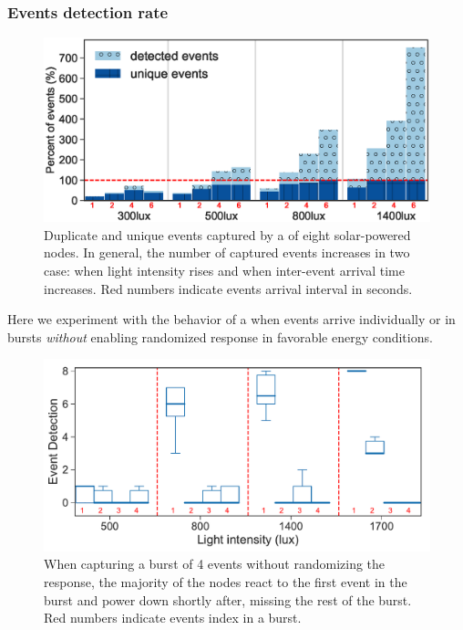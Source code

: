 \subsubsection{Events detection rate}
%
\begin{figure}[t!]
		\centering
	    \includegraphics[width=\columnwidth]{figures/regular_events_capture_rate.eps}
		\caption{Duplicate and unique events captured by a \fullcim of eight solar-powered nodes. In general, the number of captured events increases in two case: when light intensity rises and when inter-event arrival time increases. 
         Red numbers indicate events arrival interval in seconds.
         }
    	\label{fig:events_detection_rate}
\end{figure} 
Here we experiment with the behavior of a \cis when events arrive individually or in bursts \emph{without} enabling  randomized response in favorable energy conditions. 
%
\begin{figure}[t]
    \includegraphics[width=\columnwidth]{figures/events_burst_problem}
	\caption{When capturing a burst of 4 events without randomizing the response, the majority of the nodes react to the first event in the burst and power down shortly after, missing the rest of the burst. Red numbers indicate events index in a burst.}
    \label{fig:events_burst_problem}
\end{figure}
%
